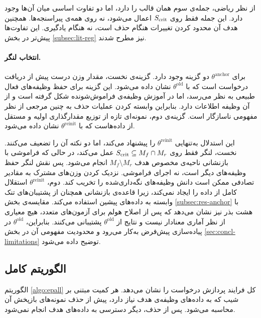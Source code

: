 از نظر ریاضی، جمله‌ی سوم همان قالب  \cite{kirkpatrick2017overcoming} را دارد، اما دو تفاوت اساسی میان آن‌ها وجود دارد. این جمله فقط روی $S_{\mathrm{crit}}$ اعمال می‌شود، نه روی همه‌ی پیراسنجه‌ها. همچنین هدف آن محدود کردن تغییرات هنگام حذف است، نه هنگام یادگیری. این تفاوت‌ها پیش‌تر در بخش \ref{subsec:lit-reg} نیز مطرح شدند.

\paragraph{انتخاب لنگر.} برای $\theta^{\mathrm{anchor}}$ دو گزینه وجود دارد. گزینه‌ی نخست، مقدار وزن درست پیش از دریافت درخواست است که با $\theta^{\mathrm{old}}$ نشان داده می‌شود. این گزینه برای حفظ وظیفه‌های فعال طبیعی به نظر می‌رسد، اما در آموزش وظیفه‌ی فراموش‌شونده شکل گرفته است و از آن وظیفه اطلاعات دارد. بنابراین وابسته کردن عملیات حذف به چنین مرجعی از نظر مفهومی ناسازگار است. گزینه‌ی دوم، نمونه‌ای تازه از توزیع مقدارگذاری اولیه و مستقل از داده‌هاست که با $\theta^{\mathrm{reinit}}$ نشان داده می‌شود.

این استدلال به‌تنهایی $\theta^{\mathrm{reinit}}$ را پیشنهاد می‌کند، اما دو نکته آن را تضعیف می‌کنند. نخست، لنگر فقط روی $S_{\mathrm{crit}} \subseteq M_f \cap M_r$ عمل می‌کند، در حالی که فراموشی با بازنشانی ناحیه‌ی مخصوص هدف $M_f \setminus M_r$ انجام می‌شود. پس نقش لنگر حفظ وظیفه‌های دیگر است، نه اجرای فراموشی. نزدیک کردن وزن‌های مشترک به مقادیر تصادفی ممکن است دانش وظیفه‌های نگه‌داری‌شده را تخریب کند. دوم، $\theta^{\mathrm{reinit}}$ استقلال کامل از داده را ایجاد نمی‌کند، زیرا قاعده‌ی بازنشانی همچنان از پشتیبان‌های تنک وابسته به داده‌های پیشین استفاده می‌کند. مقایسه‌ی بخش \ref{subsec:res-anchor} با هشت بذر نیز نشان می‌دهد که پس از اصلاح هولم برای آزمون‌های متعدد، هیچ معیاری از نظر آماری معنادار نیست و نتایج  از $\theta^{\mathrm{old}}$ پشتیبانی می‌کنند. بنابراین، $\theta^{\mathrm{old}}$ در پیاده‌سازی پیش‌فرض به‌کار می‌رود و محدودیت مفهومی آن در بخش \ref{sec:concl-limitations} توضیح داده می‌شود.

\subsection{الگوریتم کامل}
\label{subsec:prop-algorithm}

الگوریتم \ref{algo:epall} کل فرایند پردازش درخواست را نشان می‌دهد. هر کمیت مبتنی بر شیب که به داده‌های وظیفه‌ی هدف نیاز دارد، پیش از حذف نمونه‌های بازپخش آن محاسبه می‌شود. پس از حذف، دیگر دسترسی به داده‌های هدف انجام نمی‌شود.

